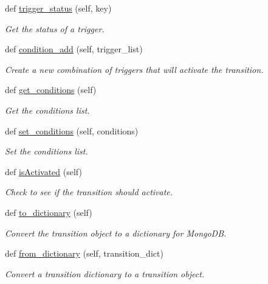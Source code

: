 \begin{DoxyCompactItemize}
def \hyperlink{classmain_1_1_transition_acbbb9b31789620185ecfd420958457d5}{trigger\+\_\+status} (self, key)
\begin{DoxyCompactList}\small\item\em Get the status of a trigger. \end{DoxyCompactList}\item 
def \hyperlink{classmain_1_1_transition_a3d7379857189a9e58da009fc12bc0c04}{condition\+\_\+add} (self, trigger\+\_\+list)
\begin{DoxyCompactList}\small\item\em Create a new combination of triggers that will activate the transition. \end{DoxyCompactList}\item 
def \hyperlink{classmain_1_1_transition_a54517857aaf67b0ba159306854e9b91f}{get\+\_\+conditions} (self)
\begin{DoxyCompactList}\small\item\em Get the conditions list. \end{DoxyCompactList}\item 
def \hyperlink{classmain_1_1_transition_a48a94866892cd2c66cd7e0a6c0c63d82}{set\+\_\+conditions} (self, conditions)
\begin{DoxyCompactList}\small\item\em Set the conditions list. \end{DoxyCompactList}\item 
def \hyperlink{classmain_1_1_transition_aff9bd394ea25ea0eccb698001562514e}{is\+Activated} (self)
\begin{DoxyCompactList}\small\item\em Check to see if the transition should activate. \end{DoxyCompactList}\item 
def \hyperlink{classmain_1_1_transition_a101d38d21ff5a3a8179b85cd58c9d229}{to\+\_\+dictionary} (self)
\begin{DoxyCompactList}\small\item\em Convert the transition object to a dictionary for Mongo\+DB. \end{DoxyCompactList}\item 
def \hyperlink{classmain_1_1_transition_a452f094a9244b67189763a5839c72f23}{from\+\_\+dictionary} (self, transition\+\_\+dict)
\begin{DoxyCompactList}\small\item\em Convert a transition dictionary to a transition object. \end{DoxyCompactList}\end{DoxyCompactItemize}



